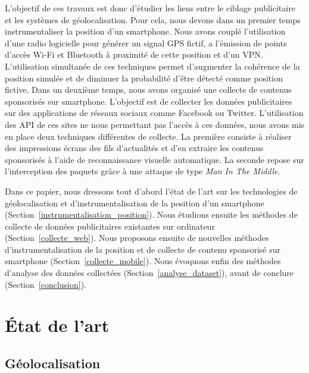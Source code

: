 \documentclass[runningheads]{llncs}
\begin{document}
L'objectif de ces travaux est donc d'étudier les liens entre le ciblage publicitaire et les systèmes de géolocalisation. Pour cela, nous devons dans un premier temps instrumentaliser la position d'un smartphone. Nous avons couplé l'utilisation d'une radio logicielle pour générer un signal GPS fictif, a l'émission de points d'accès Wi-Fi et Bluetooth à proximité de cette position et d'un VPN. L'utilisation simultanée de ces techniques permet d'augmenter la cohérence de la position simulée et de diminuer la probabilité d'être détecté comme position fictive. Dans un deuxième temps, nous avons organisé une collecte de contenus sponsorisés sur smartphone. L'objectif est de collecter les données publicitaires sur des applications de réseaux sociaux comme Facebook ou Twitter. L'utilisation des API de ces sites ne nous permettant pas l'accès à ces données, nous avons mis en place deux techniques différentes de collecte. La première consiste à réaliser des impressions écrans des fils d'actualités et d'en extraire les contenus sponsorisés à l'aide de reconnaissance visuelle automatique. La seconde repose sur l'interception des paquets grâce à une attaque de type \textit{Man In The Middle}.

 Dans ce papier, nous dressons tout d'abord l'état de l'art sur les technologies de géolocalisation et d'instrumentalisation de la position d'un smartphone (Section~\ref{instrumentalisation_position}). Nous étudions ensuite les méthodes de collecte de données publicitaires existantes sur ordinateur (Section~\ref{collecte_web}). Nous proposons ensuite de nouvelles méthodes d'instrumentalisation de la position et de collecte de contenu sponsorisé sur smartphone (Section~\ref{collecte_mobile}). Nous évoquons enfin des méthodes d'analyse des données collectées (Section~\ref{analyse_dataset}), avant de conclure (Section~\ref{conclusion}).

\section{État de l'art}

\subsection{Géolocalisation}
\end{document}
